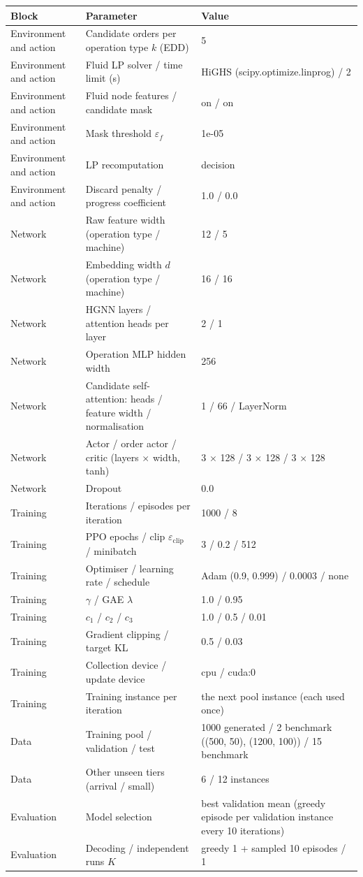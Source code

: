\begin{tabular}{lll}
\toprule
Block & Parameter & Value \\
\midrule
Environment and action & Candidate orders per operation type $k$ (EDD) & 5 \\
Environment and action & Fluid LP solver / time limit (s) & HiGHS (scipy.optimize.linprog) / 2 \\
Environment and action & Fluid node features / candidate mask & on / on \\
Environment and action & Mask threshold $\varepsilon_f$ & 1e-05 \\
Environment and action & LP recomputation & decision \\
Environment and action & Discard penalty / progress coefficient & 1.0 / 0.0 \\
Network & Raw feature width (operation type / machine) & 12 / 5 \\
Network & Embedding width $d$ (operation type / machine) & 16 / 16 \\
Network & HGNN layers / attention heads per layer & 2 / 1 \\
Network & Operation MLP hidden width & 256 \\
Network & Candidate self-attention: heads / feature width / normalisation & 1 / 66 / LayerNorm \\
Network & Actor / order actor / critic (layers $\times$ width, tanh) & 3 $\times$ 128 / 3 $\times$ 128 / 3 $\times$ 128 \\
Network & Dropout & 0.0 \\
Training & Iterations / episodes per iteration & 1000 / 8 \\
Training & PPO epochs / clip $\varepsilon_{\mathrm{clip}}$ / minibatch & 3 / 0.2 / 512 \\
Training & Optimiser / learning rate / schedule & Adam (0.9, 0.999) / 0.0003 / none \\
Training & $\gamma$ / GAE $\lambda$ & 1.0 / 0.95 \\
Training & $c_1$ / $c_2$ / $c_3$ & 1.0 / 0.5 / 0.01 \\
Training & Gradient clipping / target KL & 0.5 / 0.03 \\
Training & Collection device / update device & cpu / cuda:0 \\
Training & Training instance per iteration & the next pool instance (each used once) \\
Data & Training pool / validation / test & 1000 generated / 2 benchmark ((500, 50), (1200, 100)) / 15 benchmark \\
Data & Other unseen tiers (arrival / small) & 6 / 12 instances \\
Evaluation & Model selection & best validation mean (greedy episode per validation instance every 10 iterations) \\
Evaluation & Decoding / independent runs $K$ & greedy 1 + sampled 10 episodes / 1 \\
\bottomrule
\end{tabular}
